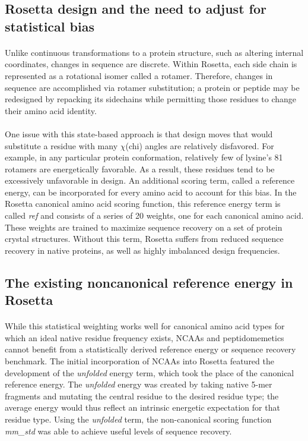 \subsection{Rosetta design and the need to adjust for statistical bias}
\paragraph{}
Unlike continuous transformations to a protein structure, such as altering internal coordinates, changes in sequence are discrete.
Within Rosetta, each side chain is represented as a rotational isomer called a rotamer.
Therefore, changes in sequence are accomplished via rotamer substitution; a protein or peptide may be redesigned by repacking its sidechains while permitting those residues to change their amino acid identity\cite{leaver-fay_chapter_2011}.

\paragraph{}
One issue with this state-based approach is that design moves that would substitute a residue with many $\chi$(chi) angles are relatively disfavored. For example, in any particular protein conformation, relatively few of lysine's 81 rotamers are energetically favorable.
As a result, these residues tend to be excessively unfavorable in design\cite{leaver-fay_chapter_2013,rohl_protein_2004}.
An additional scoring term, called a reference energy, can be incorporated for every amino acid to account for this bias. 
In the Rosetta canonical amino acid scoring function, this reference energy term is called \textit{ref} and consists of a series of 20 weights, one for each canonical amino acid.
These weights are trained to maximize sequence recovery on a set of protein crystal structures.
Without this term, Rosetta suffers from reduced sequence recovery in native proteins, as well as highly imbalanced design frequencies\cite{rohl_protein_2004}.

\subsection{The existing noncanonical reference energy in Rosetta}

\paragraph{}
While this statistical weighting works well for canonical amino acid types for which an ideal native residue frequency exists, NCAAs and peptidomemetics cannot benefit from a statistically derived reference energy or sequence recovery benchmark.
The initial incorporation of NCAAs into Rosetta featured the development of the \textit{unfolded} energy term, which took the place of the canonical reference energy\cite{renfrew_incorporation_2012}.
The \textit{unfolded} energy was created by taking native 5-mer fragments and mutating the central residue to the desired residue type; the average energy would thus reflect an intrinsic energetic expectation for that residue type.
Using the \textit{unfolded} term, the non-canonical scoring function \textit{mm\_std} was able to achieve useful levels of sequence recovery.

